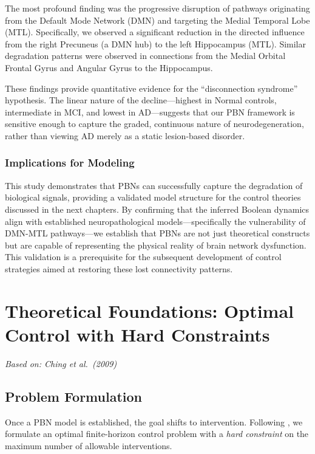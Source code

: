 \documentclass[12pt, a4paper]{report}
\begin{document}
The most profound finding was the progressive disruption of pathways originating from the Default Mode Network (DMN) and targeting the Medial Temporal Lobe (MTL). Specifically, we observed a significant reduction in the directed influence from the right Precuneus (a DMN hub) to the left Hippocampus (MTL). Similar degradation patterns were observed in connections from the Medial Orbital Frontal Gyrus and Angular Gyrus to the Hippocampus.

These findings provide quantitative evidence for the ``disconnection syndrome'' hypothesis. The linear nature of the decline—highest in Normal controls, intermediate in MCI, and lowest in AD—suggests that our PBN framework is sensitive enough to capture the graded, continuous nature of neurodegeneration, rather than viewing AD merely as a static lesion-based disorder.

\subsection{Implications for Modeling}
This study demonstrates that PBNs can successfully capture the degradation of biological signals, providing a validated model structure for the control theories discussed in the next chapters. By confirming that the inferred Boolean dynamics align with established neuropathological models—specifically the vulnerability of DMN-MTL pathways—we establish that PBNs are not just theoretical constructs but are capable of representing the physical reality of brain network dysfunction. This validation is a prerequisite for the subsequent development of control strategies aimed at restoring these lost connectivity patterns.
	
\chapter{Theoretical Foundations: Optimal Control with Hard Constraints}
\label{chap:theory}

\textit{Based on: Ching et al.~(2009)~\cite{ching2009optimal}}

\section{Problem Formulation}
Once a PBN model is established, the goal shifts to intervention. Following \cite{ching2009optimal}, we formulate an optimal finite-horizon control problem with a \emph{hard constraint} on the maximum number of allowable interventions.
\end{document}

